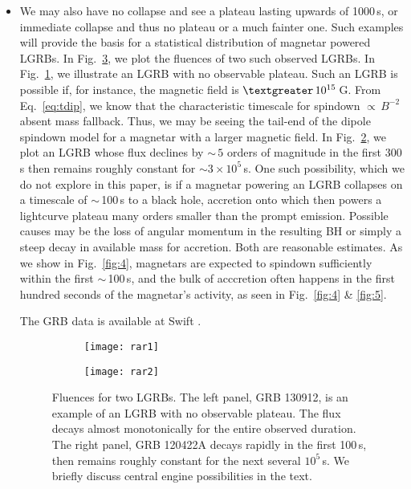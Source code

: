 \documentclass{article}
\begin{document}
\begin{itemize}
\item We may also have no collapse and see a plateau lasting upwards of 1000\,s, or immediate collapse and thus no plateau or a much fainter one. Such examples will provide the basis for a statistical distribution of magnetar powered LGRBs. In Fig.~\ref{fig:rar}, we plot the fluences of two such observed LGRBs. In Fig.~\ref{fig:rar1}, we illustrate an LGRB with no observable plateau. Such an LGRB is possible if, for instance, the magnetic field is $\textgreater\,10^{15}$\,G. From Eq.~\ref{eq:tdip}, we know that the characteristic timescale for spindown $\propto\,B^{-2}$ absent mass fallback. Thus, we may be seeing the tail-end of the dipole spindown model for a magnetar with a larger magnetic field. In Fig.~\ref{fig:rar2}, we plot an LGRB whose flux declines by $\sim\,5$ orders of magnitude in the first 300\,s then remains roughly constant for $\sim 3\times 10^{5}$\,s. One such possibility, which we do not explore in this paper, is if a magnetar powering an LGRB collapses on a timescale of $\sim$\,100\,s to a black hole, accretion onto which then powers a lightcurve plateau many orders smaller than the prompt emission. Possible causes may be the loss of angular momentum in the resulting BH or simply a steep decay in available mass for accretion. Both are reasonable estimates. As we show in Fig.~\ref{fig:4}, magnetars are expected to spindown sufficiently within the first $\sim$\,100\,s, and the bulk of acccretion often happens in the first hundred seconds of the magnetar's activity, as seen in Fig.~\ref{fig:4} \& \ref{fig:5}.

 The GRB data is available at Swift \cite{swift}.

\begin{figure}[h!]
\centering
\begin{subfigure}{.55\textwidth}
\centering
\texttt{[image: rar1]}
\caption{}
\label{fig:rar1}
\end{subfigure}%
\begin{subfigure}{.55\textwidth}
\centering
\texttt{[image: rar2]}
\caption{}
\label{fig:rar2}
\end{subfigure}
\caption{Fluences for two LGRBs. The left panel, GRB 130912, is an example of an LGRB with no observable plateau. The flux decays almost monotonically for the entire observed duration. The right panel, GRB 120422A decays rapidly in the first 100\,s, then remains roughly constant for the next several $10^5$\,s. We briefly discuss central engine possibilities in the text.}
\label{fig:rar}
\end{figure}
\end{itemize}
\end{document}
